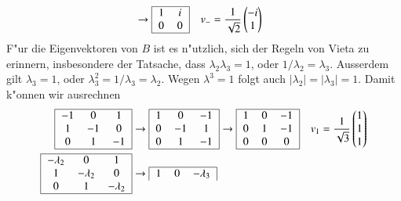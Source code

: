 \begin{loesung}
\begin{align*}
&\rightarrow
\begin{tabular}{|>{$}c<{$}>{$}c<{$}|}
\hline
 1& i\\
 0& 0\\
\hline
\end{tabular}
&v_-&=\frac{1}{\sqrt{2}}\begin{pmatrix}-i\\1\end{pmatrix}
\end{align*}
F"ur die Eigenvektoren von $B$ ist es n"utzlich,
sich der Regeln von Vieta zu erinnern, insbesondere
der Tatsache, dass $\lambda_2\lambda_3=1$, oder $1/\lambda_2=\lambda_3$.
Ausserdem gilt $\lambda_3=1$, oder $\lambda_3^2=1/\lambda_3=\lambda_2$.
Wegen $\lambda^3=1$ folgt auch $|\lambda_2|=|\lambda_3|=1$.
Damit k"onnen wir ausrechnen
\begin{align*}
\begin{tabular}{|>{$}c<{$}>{$}c<{$}>{$}c<{$}|}
\hline
-1& 0& 1\\
 1&-1& 0\\
 0& 1&-1\\
\hline
\end{tabular}
&
\rightarrow
\begin{tabular}{|>{$}c<{$}>{$}c<{$}>{$}c<{$}|}
\hline
 1& 0&-1\\
 0&-1& 1\\
 0& 1&-1\\
\hline
\end{tabular}
\rightarrow
\begin{tabular}{|>{$}c<{$}>{$}c<{$}>{$}c<{$}|}
\hline
 1& 0&-1\\
 0& 1&-1\\
 0& 0& 0\\
\hline
\end{tabular}
&
v_1&=\frac1{\sqrt{3}}\begin{pmatrix}1\\1\\1\end{pmatrix}
\\
\begin{tabular}{|>{$}c<{$}>{$}c<{$}>{$}c<{$}|}
\hline
-\lambda_2&         0&         1\\
         1&-\lambda_2&         0\\
         0&         1&-\lambda_2\\
\hline
\end{tabular}
&
\rightarrow
\begin{tabular}{|>{$}c<{$}>{$}c<{$}>{$}c<{$}|}
\hline
        1&         0&-\lambda_3\\

\end{tabular}
\end{align*}
\end{loesung}
